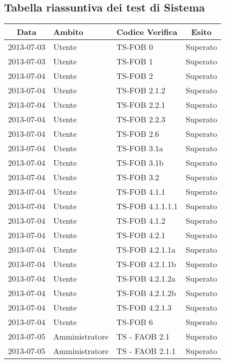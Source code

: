 {	\subsection{Tabella riassuntiva dei test di Sistema}{
		\begin{table}[h!]
			\scriptsize
			\begin{center}
				\begin{tabular}{c l l c}				
					\toprule
					Data 	& Ambito & Codice Verifica & Esito \\ 
					\midrule
					2013-07-03 & Utente & TS-FOB 0 & Superato\\ 
					2013-07-03 & Utente & TS-FOB 1 & Superato\\ 
					2013-07-04 & Utente & TS-FOB 2 & Superato\\ 
					2013-07-04 & Utente & TS-FOB 2.1.2 & Superato\\
					2013-07-04 & Utente & TS-FOB 2.2.1 & Superato\\
					2013-07-04 & Utente & TS-FOB 2.2.3 & Superato\\
					2013-07-04 & Utente & TS-FOB 2.6 & Superato\\
					2013-07-04 & Utente & TS-FOB 3.1a & Superato\\
					2013-07-04 & Utente & TS-FOB 3.1b & Superato\\
					2013-07-04 & Utente & TS-FOB 3.2 & Superato\\
					2013-07-04 & Utente & TS-FOB 4.1.1 & Superato\\
					2013-07-04 & Utente & TS-FOB 4.1.1.1.1 & Superato\\
					2013-07-04 & Utente & TS-FOB 4.1.2 & Superato\\
					2013-07-04 & Utente & TS-FOB 4.2.1 & Superato\\
					2013-07-04 & Utente & TS-FOB 4.2.1.1a & Superato\\
					2013-07-04 & Utente & TS-FOB 4.2.1.1b & Superato\\
					2013-07-04 & Utente & TS-FOB 4.2.1.2a & Superato\\
					2013-07-04 & Utente & TS-FOB 4.2.1.2b & Superato\\
					2013-07-04 & Utente & TS-FOB 4.2.1.3 & Superato\\
					2013-07-04 & Utente & TS-FOB 6 & Superato\\
					2013-07-05 & Amministratore & TS - FAOB 2.1 & Superato\\ 
					2013-07-05 & Amministratore & TS - FAOB 2.1.1 & Superato\\

\end{tabular}
\end{center}
\end{table}}}
